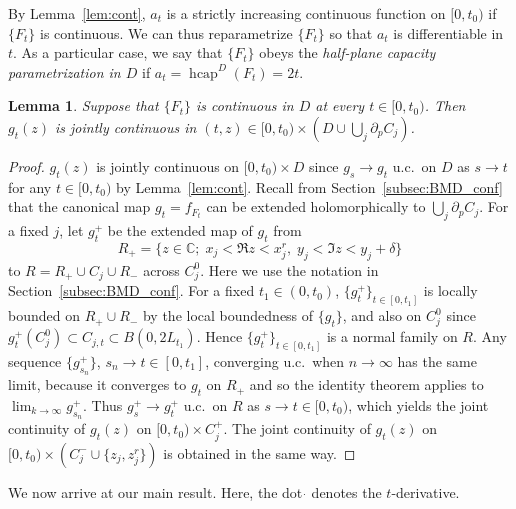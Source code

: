 \documentclass[preprint,12pt]{elsarticle}
\newtheorem{lem}[thm]{Lemma}
\theoremstyle{definition}
\newcommand{\C}{\mathbb{C}}
\DeclareMathOperator{\hcap}{hcap}
\begin{document}
By Lemma~\ref{lem:cont}, $a_t$ is a strictly increasing continuous function
on $[0, t_0)$ if $\{F_t\}$ is continuous.
We can thus reparametrize $\{F_t\}$ so that $a_t$ is differentiable in $t$.
As a particular case, we say that $\{F_t\}$ obeys
the \emph{half-plane capacity parametrization in $D$}
if $a_t=\hcap^D(F_t)=2t$.

\begin{lem} \label{lem:jointcont}
Suppose that $\{F_t\}$ is continuous in $D$ at every $t \in [0, t_0)$.
Then $g_t(z)$ is jointly continuous in
$(t,z) \in [0, t_0) \times (D \cup \bigcup_j \partial_p C_j)$.
\end{lem}

\begin{proof}
$g_t(z)$ is jointly continuous on $[0, t_0) \times D$
since $g_s \to g_t$ u.c.\ on $D$ as $s \to t$ for any $t \in [0, t_0)$
by Lemma~\ref{lem:cont}.
Recall from Section~\ref{subsec:BMD_conf} that the canonical map $g_t=f_{F_t}$
can be extended holomorphically to $\bigcup_j \partial_p C_j$.
For a fixed $j$, let $g^+_t$ be the extended map of $g_t$ from
\[
R_+=\{z \in \C ;\; x_j < \Re z < x^r_j,\; y_j < \Im z <y_j + \delta\}
\]
to $R=R_+ \cup C_j \cup R_-$ across $C^0_j$.
Here we use the notation in Section~\ref{subsec:BMD_conf}.
For a fixed $t_1\in (0, t_0)$, $\{g^+_t\}_{t \in [0, t_1]}$ is locally bounded
on $R_+ \cup R_-$ by the local boundedness of $\{g_t\}$,
and also on $C^0_j$ since $g^+_t(C^0_j) \subset C_{j,t} \subset B(0, 2L_{t_1})$.
Hence $\{g^+_t\}_{t \in [0, t_1]}$ is a normal family on $R$.
Any sequence $\{g^+_{s_n}\}$, $s_n \to t \in [0, t_1]$,
converging u.c.\ when $n \to \infty$ has the same limit,
because it converges to $g_t$ on $R_+$ and so the identity theorem applies
to $\lim_{k \to \infty}g^+_{s_n}$.
Thus $g^+_s \to g^+_t$ u.c.\ on $R$ as $s \to t \in [0, t_0)$,
which yields the joint continuity of $g_t(z)$ on $[0, t_0) \times C^+_j$.
The joint continuity of $g_t(z)$ on $[0, t_0) \times (C^-_j \cup \{z_j, z^r_j\})$
is obtained in the same way.
\end{proof}

We now arrive at our main result.
Here, the dot $\dot{ }$ denotes the $t$-derivative.
\end{document}
